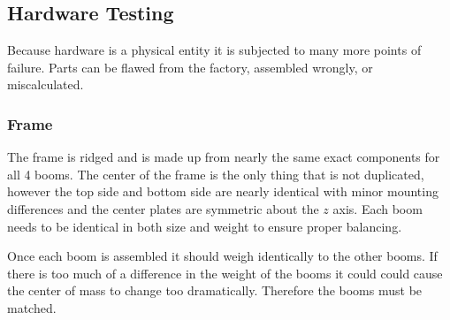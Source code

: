 \documentclass{article}
\numberwithin{equation}{section} %
\begin{document}



\subsection{Hardware Testing}
Because hardware is a physical entity it is subjected to many more points of failure. Parts can be flawed from the factory, assembled wrongly, or miscalculated.

\subsubsection{Frame}
The frame is ridged and is made up from nearly the same exact components for all 4 booms. The center of the frame is the only thing that is not duplicated, however the top side and bottom side are nearly identical with minor mounting differences and the center plates are symmetric about the $z$ axis. Each boom needs to be identical in both size and weight to ensure proper balancing.

Once each boom is assembled it should weigh identically to the other booms. If there is too much of a difference in the weight of the booms it could could cause the center of mass to change too dramatically. Therefore the booms must be matched.
\end{document}
